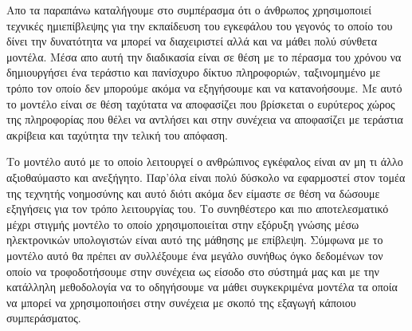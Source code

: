 \par
Απο τα παραπάνω καταλήγουμε στο συμπέρασμα ότι ο άνθρωπος χρησιμοποιεί τεχνικές ημιεπίβλεψης για την εκπαίδευση του εγκεφάλου του γεγονός το οποίο του δίνει την δυνατότητα να μπορεί να διαχειριστεί αλλά και να μάθει πολύ σύνθετα μοντέλα. Μέσα απο αυτή την διαδικασία είναι σε θέση με το πέρασμα του χρόνου να δημιουργήσει ένα τεράστιο και πανίσχυρο δίκτυο πληροφοριών, ταξινομημένο με τρόπο τον οποίο δεν μπορούμε ακόμα να εξηγήσουμε και να κατανοήσουμε. Με αυτό το μοντέλο είναι σε θέση ταχύτατα να αποφασίζει που βρίσκεται ο ευρύτερος χώρος της πληροφορίας που θέλει να αντλήσει και στην συνέχεια να αποφασίζει με τεράστια ακρίβεια και ταχύτητα την τελική του απόφαση.   
\par
Το μοντέλο αυτό με το οποίο λειτουργεί ο ανθρώπινος εγκέφαλος είναι αν μη τι άλλο αξιοθαύμαστο και ανεξήγητο. Παρ'όλα είναι πολύ δύσκολο να εφαρμοστεί στον τομέα της τεχνητής νοημοσύνης και αυτό διότι ακόμα δεν είμαστε σε θέση να δώσουμε εξηγήσεις για τον τρόπο λειτουργίας του. Το συνηθέστερο και πιο αποτελεσματικό μέχρι στιγμής μοντέλο το οποίο χρησιμοποιείται στην εξόρυξη γνώσης μέσω ηλεκτρονικών υπολογιστών είναι αυτό της μάθησης με επίβλεψη. Σύμφωνα με το μοντέλο αυτό θα πρέπει αν συλλέξουμε ένα μεγάλο συνήθως όγκο δεδομένων τον οποίο να τροφοδοτήσουμε στην συνέχεια ως είσοδο στο σύστημά μας και με την κατάλληλη μεθοδολογία να το οδηγήσουμε να μάθει συγκεκριμένα μοντέλα τα οποία να μπορεί να χρησιμοποιήσει στην συνέχεια με σκοπό της εξαγωγή κάποιου συμπεράσματος.

